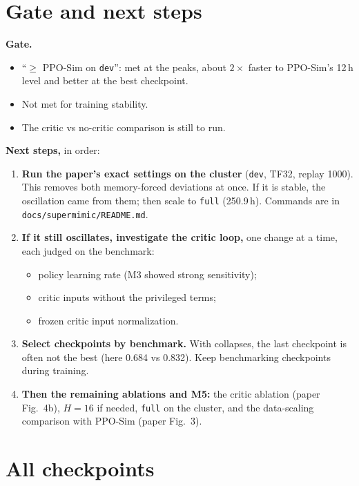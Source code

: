 \documentclass[10pt]{article}
\begin{document}
\section{Gate and next steps}

\textbf{Gate.}
\begin{itemize}
  \item ``$\geq$ PPO-Sim on \texttt{dev}'': met at the peaks, about $2\times$ faster to PPO-Sim's
  12\,h level and better at the best checkpoint.
  \item Not met for training stability.
  \item The critic vs no-critic comparison is still to run.
\end{itemize}

\textbf{Next steps,} in order:
\begin{enumerate}
  \item \textbf{Run the paper's exact settings on the cluster} (\texttt{dev}, TF32, replay 1000). This
  removes both memory-forced deviations at once. If it is stable, the oscillation came from them; then
  scale to \texttt{full} (250.9\,h). Commands are in \texttt{docs/supermimic/README.md}.
  \item \textbf{If it still oscillates, investigate the critic loop,} one change at a time, each judged
  on the benchmark:
  \begin{itemize}
    \item policy learning rate (M3 showed strong sensitivity);
    \item critic inputs without the privileged terms;
    \item frozen critic input normalization.
  \end{itemize}
  \item \textbf{Select checkpoints by benchmark.} With collapses, the last checkpoint is often not the
  best (here 0.684 vs 0.832). Keep benchmarking checkpoints during training.
  \item \textbf{Then the remaining ablations and M5:} the critic ablation (paper Fig.~4b), $H = 16$ if
  needed, \texttt{full} on the cluster, and the data-scaling comparison with PPO-Sim (paper
  Fig.~3).
\end{enumerate}

\appendix
\section{All checkpoints}

\begin{table}[H]
\centering\small
\caption{The paper's benchmark of every checkpoint of both runs (1296 \texttt{dev} clips).}
\label{tab:benchmark}

\end{table}
\end{document}
